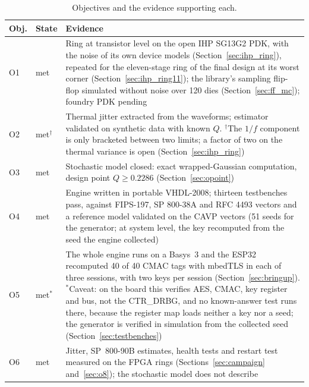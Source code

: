 \begin{table}[htbp]
\centering
\caption{Objectives and the evidence supporting each.}
\label{tab:status}
\small
\begin{tabular}{@{}llp{7.4cm}@{}}
\toprule
Obj. & State & Evidence \\
\midrule
O1 & met    & Ring at transistor level on the open IHP SG13G2 \ac{PDK},
              with the noise of its own device models
              (Section~\ref{sec:ihp_ring}), repeated for the eleven-stage
              ring of the final design at its worst corner
              (Section~\ref{sec:ihp_ring11}); the library's sampling
              flip-flop simulated without noise over 120 dies
              (Section~\ref{sec:ff_mc}); foundry \ac{PDK} pending \\
O2 & met$^{\dagger}$ & Thermal jitter extracted from the waveforms;
              estimator validated on synthetic data with known $Q$.
              $^{\dagger}$The $1/f$ component is only bracketed between
              two limits; a factor of two on the thermal variance is
              open (Section~\ref{sec:ihp_ring}) \\
O3 & met    & Stochastic model closed: exact wrapped-Gaussian computation,
              design point $Q \ge 0.2286$ (Section~\ref{sec:opoint}) \\
O4 & met    & Engine written in portable VHDL-2008; thirteen testbenches
              pass, against FIPS-197, SP 800-38A and RFC 4493 vectors and
              a reference model validated on the \ac{CAVP} vectors (51
              seeds for the generator; at system level, the key
              recomputed from the seed the engine collected) \\
O5 & met$^{*}$ & The whole engine runs on a Basys~3 and the ESP32 recomputed
              40 of 40 \ac{CMAC} tags with mbedTLS in each of three
              sessions, with two keys per session \meas{}
              (Section~\ref{sec:bringup}). $^{*}$Caveat: on the board this
              verifies \ac{AES}, \ac{CMAC}, key register and bus, not the
              CTR\_DRBG, and no known-answer test runs there, because the
              register map loads neither a key nor a seed; the generator
              is verified in simulation from the collected seed
              (Section~\ref{sec:testbenches}) \\
O6 & met    & Jitter, SP~800-90B estimates, health tests and restart test
              measured on the \ac{FPGA} rings (Sections~\ref{sec:campaign}
              and~\ref{sec:o8}); the stochastic model does not describe

\end{tabular}
\end{table}
